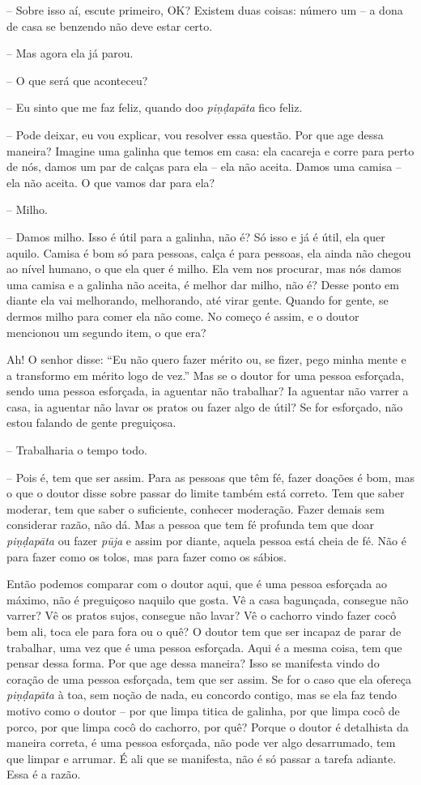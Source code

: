 -- Sobre isso aí, escute primeiro, OK? Existem duas coisas: número
um – a dona de casa se benzendo não deve estar certo.

-- Mas agora ela já parou.

-- O que será que aconteceu?

 -- Eu sinto que me faz feliz, quando doo
\emph{piṇḍapāta} fico feliz.

 -- Pode deixar, eu vou explicar, vou resolver
essa questão. Por que age dessa maneira? Imagine uma galinha que temos
em casa: ela cacareja e corre para perto de nós, damos um par de calças
para ela – ela não aceita. Damos uma camisa – ela não aceita. O que
vamos dar para ela? 

 -- Milho.

-- Damos milho. Isso é útil para a galinha, não é? Só isso e já é
útil, ela quer aquilo. Camisa é bom só para pessoas, calça é para
pessoas, ela ainda não chegou ao nível humano, o que ela quer é milho.
Ela vem nos procurar, mas nós damos uma camisa e a galinha não aceita,
é melhor dar milho, não é? Desse ponto em diante ela vai melhorando,
melhorando, até virar gente. Quando for gente, se dermos milho para
comer ela não come. No começo é assim, e o doutor mencionou um segundo
item, o que era?

Ah! O senhor disse: “Eu não quero fazer mérito ou, se fizer, pego
minha mente e a transformo em mérito logo de vez.” Mas se o doutor for
uma pessoa esforçada, sendo uma pessoa esforçada, ia aguentar não
trabalhar? Ia aguentar não varrer a casa, ia aguentar não lavar os
pratos ou fazer algo de útil? Se for esforçado, não estou falando de
gente preguiçosa. 

-- Trabalharia o tempo todo.

-- Pois é, tem que ser assim. Para as pessoas que têm fé, fazer
doações é bom, mas o que o doutor disse sobre passar do limite também
está correto. Tem que saber moderar, tem que saber o suficiente,
conhecer moderação. Fazer demais sem considerar razão, não dá. Mas a
pessoa que tem fé profunda tem que doar \emph{piṇḍapāta} ou fazer
\emph{pūja} e assim por diante, aquela pessoa está cheia de fé. Não
é para fazer como os tolos, mas para fazer como os sábios. 

Então podemos comparar com o doutor aqui, que é uma pessoa esforçada
ao máximo, não é preguiçoso naquilo que gosta. Vê a casa bagunçada,
consegue não varrer? Vê os pratos sujos, consegue não lavar? Vê o
cachorro vindo fazer cocô bem ali, toca ele para fora ou o quê? O
doutor tem que ser incapaz de parar de trabalhar, uma vez que é uma
pessoa esforçada. Aqui é a mesma coisa, tem que pensar dessa forma. Por
que age dessa maneira? Isso se manifesta vindo do coração de uma pessoa
esforçada, tem que ser assim. Se for o caso que ela ofereça
\emph{piṇḍapāta} à toa, sem noção de nada, eu concordo contigo, mas
se ela faz tendo motivo como o doutor – por que limpa titica de
galinha, por que limpa cocô de porco, por que limpa cocô do cachorro,
por quê? Porque o doutor é detalhista da maneira correta, é uma pessoa
esforçada, não pode ver algo desarrumado, tem que limpar e arrumar. É
ali que se manifesta, não é só passar a tarefa adiante. Essa é a razão.


